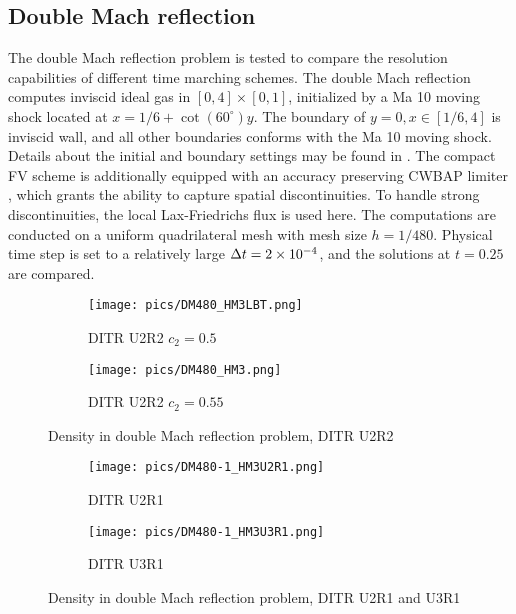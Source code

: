 \subsection{Double Mach reflection}

The double Mach reflection problem \cite{woodward1984dmr} is tested to
compare the resolution capabilities
of different time marching schemes.
The double Mach reflection computes
inviscid ideal gas in $[0,4]\times[0,1]$,
initialized by a Ma 10 moving shock located
at $x = 1/6 + \cot(60^\circ) y$.
The boundary of $y=0, x\in[1/6,4]$ is
inviscid wall, and all other boundaries
conforms with the Ma 10 moving shock.
Details about the initial and boundary settings may be found in \cite{woodward1984dmr}.
The compact FV scheme is additionally equipped with
an accuracy preserving CWBAP limiter \cite{wu2023cwbap},
which grants the ability to capture spatial  discontinuities.
To handle strong discontinuities, the local Lax-Friedrichs flux
is used here.
The computations are conducted on a uniform quadrilateral mesh with
mesh size $h=1/480$.
Physical time step is set to a relatively large $\mathrm\Delta t= 2\times10^{-4}$,
and the solutions at $t=0.25$ are compared.

\begin{figure}[htbp]
    \centering
    \begin{subfigure}{0.5\textwidth}
        \texttt{[image: pics/DM480\_HM3LBT.png]}
        \caption[]{DITR U2R2 $c_2=0.5$}
        \label{sfig:DM480_HM3LBT}
    \end{subfigure}\hfill
    \begin{subfigure}{0.5\textwidth}
        \texttt{[image: pics/DM480\_HM3.png]}
        \caption[]{DITR U2R2 $c_2=0.55$}
        \label{sfig:DM480_HM3}
    \end{subfigure}
    \caption{Density in double Mach reflection problem, DITR U2R2}
    \label{fig:DM480-1}
\end{figure}

\begin{figure}[htbp]
    \centering
    \begin{subfigure}{0.5\textwidth}
        \texttt{[image: pics/DM480-1\_HM3U2R1.png]}
        \caption[]{DITR U2R1}
        \label{sfig:DM480_HM3U2R1}
    \end{subfigure}\hfill
    \begin{subfigure}{0.5\textwidth}
        \texttt{[image: pics/DM480-1\_HM3U3R1.png]}
        \caption[]{DITR U3R1}
        \label{sfig:DM480_HM3U3R1}
    \end{subfigure}
    \caption{Density in double Mach reflection problem, DITR U2R1 and U3R1}
    \label{fig:DM480-2}
\end{figure}


